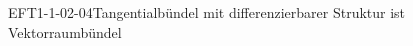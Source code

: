 
\begin{EXA}{EFT1-1-02-04}{Tangentialbündel mit differenzierbarer Struktur ist Vektorraumbündel}
\end{EXA}
